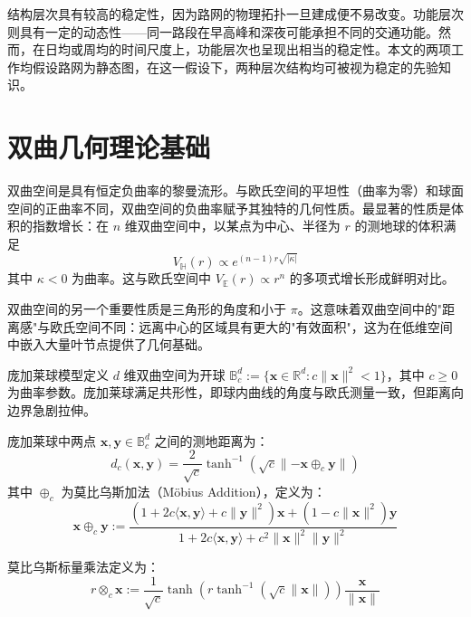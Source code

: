 结构层次具有较高的稳定性，因为路网的物理拓扑一旦建成便不易改变。功能层次则具有一定的动态性——同一路段在早高峰和深夜可能承担不同的交通功能。然而，在日均或周均的时间尺度上，功能层次也呈现出相当的稳定性。本文的两项工作均假设路网为静态图，在这一假设下，两种层次结构均可被视为稳定的先验知识。

\section{双曲几何理论基础}

双曲空间是具有恒定负曲率的黎曼流形。与欧氏空间的平坦性（曲率为零）和球面空间的正曲率不同，双曲空间的负曲率赋予其独特的几何性质。最显著的性质是体积的指数增长：在 $n$ 维双曲空间中，以某点为中心、半径为 $r$ 的测地球的体积满足
\begin{equation}
    V_{\mathbb{H}}(r) \propto e^{(n-1)r\sqrt{|\kappa|}}
\end{equation}
其中 $\kappa < 0$ 为曲率。这与欧氏空间中 $V_{\mathbb{E}}(r) \propto r^n$ 的多项式增长形成鲜明对比。

双曲空间的另一个重要性质是三角形的角度和小于 $\pi$。这意味着双曲空间中的"距离感"与欧氏空间不同：远离中心的区域具有更大的"有效面积"，这为在低维空间中嵌入大量叶节点提供了几何基础。

庞加莱球模型定义 $d$ 维双曲空间为开球 $\mathbb{B}_c^d := \{\mathbf{x} \in \mathbb{R}^d : c\|\mathbf{x}\|^2 < 1\}$，其中 $c \geq 0$ 为曲率参数。庞加莱球满足共形性，即球内曲线的角度与欧氏测量一致，但距离向边界急剧拉伸。

庞加莱球中两点 $\mathbf{x}, \mathbf{y} \in \mathbb{B}_c^d$ 之间的测地距离为：
\begin{equation}
    d_c(\mathbf{x}, \mathbf{y}) = \frac{2}{\sqrt{c}} \tanh^{-1}\left(\sqrt{c}\|\mathbf{-x} \oplus_c \mathbf{y}\|\right)
\end{equation}
其中 $\oplus_c$ 为莫比乌斯加法（M\"{o}bius Addition），定义为：
\begin{equation}
    \mathbf{x} \oplus_c \mathbf{y} := \frac{(1 + 2c\langle \mathbf{x},\mathbf{y}\rangle + c\|\mathbf{y}\|^2)\mathbf{x} + (1 - c\|\mathbf{x}\|^2)\mathbf{y}}{1 + 2c\langle \mathbf{x},\mathbf{y}\rangle + c^2\|\mathbf{x}\|^2\|\mathbf{y}\|^2}
\end{equation}

莫比乌斯标量乘法定义为：
\begin{equation}
    r \otimes_c \mathbf{x} := \frac{1}{\sqrt{c}}\tanh\left(r\tanh^{-1}(\sqrt{c}\|\mathbf{x}\|)\right)\frac{\mathbf{x}}{\|\mathbf{x}\|}
\end{equation}

